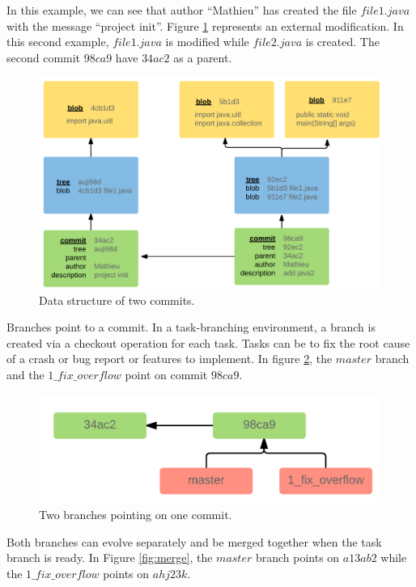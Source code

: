 In this example, we can see that author ``Mathieu'' has created the file $file1.java$ with the message ``project init''.
Figure \ref{fig:two-commits} represents an external modification.
In this second example, $file1. java$ is modified while $file2.java$ is created.
The second commit $98ca9$ have $34ac2$ as a parent.

\begin{figure}[h!]
  \centering
    \includegraphics[scale=0.25]{media/branching.png}
    \caption{Data structure of two commits.
    \label{fig:two-commits}}
\end{figure}

Branches point to a commit.
In a task-branching environment, a branch is created via a checkout operation for each task.
Tasks can be to fix the root cause of a crash or bug report or features to implement.
In figure \ref{fig:two-branches}, the $master$ branch and the $1\_fix\_overflow$ point on commit $98ca9$.

\begin{figure}[h!]
  \centering
    \includegraphics[scale=0.25]{media/2branches.png}
    \caption{Two branches pointing on one commit.
    \label{fig:two-branches}}
\end{figure}

Both branches can evolve separately and be merged together when the task branch is ready.
In Figure \ref{fig:merge}, the $master$ branch points on $a13ab2$ while the $1\_fix\_overflow$ points on $ahj23k$.

